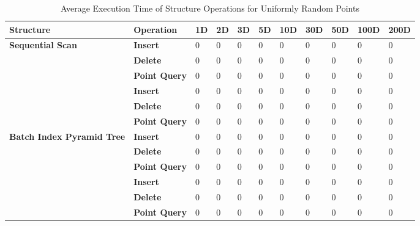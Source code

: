 \begin{table}
	\centering
	\begin{tabular}{|l|l|l|l|l|l|l|l|l|l|l|}
		\hline
		\textbf{Structure} & \textbf{Operation} & \textbf{1D} & \textbf{2D} & \textbf{3D} & \textbf{5D} & \textbf{10D} & \textbf{30D} & \textbf{50D} & \textbf{100D} & \textbf{200D} \\
		\hline
		\multirow{ 4}{*}{\textbf{Sequential Scan}} & \textbf{Insert} & 0 & 0 & 0 & 0 & 0 & 0 & 0 & 0 & 0 \\
		 & \textbf{Delete} & 0 & 0 & 0 & 0 & 0 & 0 & 0 & 0 & 0 \\
		 & \textbf{Point Query} & 0 & 0 & 0 & 0 & 0 & 0 & 0 & 0 & 0 \\
		\hline
		\multirow{ 4}{*}{\textbf{Octree}} & \textbf{Insert} & 0 & 0 & 0 & 0 & 0 & 0 & 0 & 0 & 0 \\
		 & \textbf{Delete} & 0 & 0 & 0 & 0 & 0 & 0 & 0 & 0 & 0 \\
		 & \textbf{Point Query} & 0 & 0 & 0 & 0 & 0 & 0 & 0 & 0 & 0 \\
		\hline
		\multirow{ 4}{*}{\textbf{Batch Index Pyramid Tree}} & \textbf{Insert} & 0 & 0 & 0 & 0 & 0 & 0 & 0 & 0 & 0 \\
		 & \textbf{Delete} & 0 & 0 & 0 & 0 & 0 & 0 & 0 & 0 & 0 \\
		 & \textbf{Point Query} & 0 & 0 & 0 & 0 & 0 & 0 & 0 & 0 & 0 \\
		\hline
		\multirow{ 4}{*}{\textbf{Defragmented Index Pyramid Tree}} & \textbf{Insert} & 0 & 0 & 0 & 0 & 0 & 0 & 0 & 0 & 0 \\
		 & \textbf{Delete} & 0 & 0 & 0 & 0 & 0 & 0 & 0 & 0 & 0 \\
		 & \textbf{Point Query} & 0 & 0 & 0 & 0 & 0 & 0 & 0 & 0 & 0 \\
		\hline
	\end{tabular}
	\caption{Average Execution Time of Structure Operations for Uniformly Random Points}
	\label{tab:perf1-randuniform}
\end{table}

